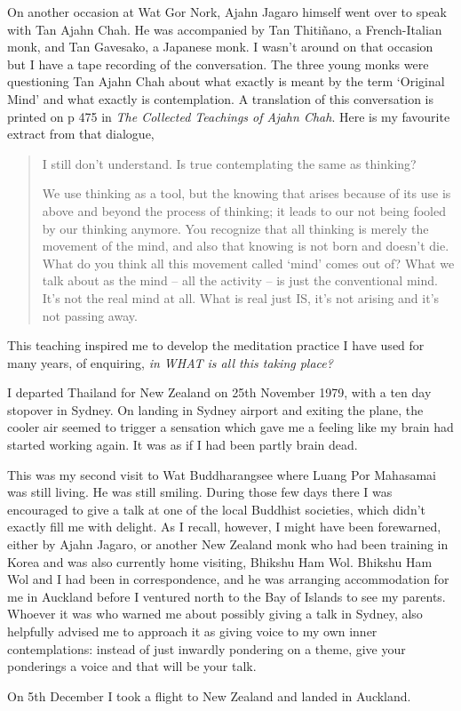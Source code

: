 On another occasion at Wat Gor Nork, Ajahn Jagaro himself went over to
speak with Tan Ajahn Chah. He was accompanied by Tan Thitiñano, a
French-Italian monk, and Tan Gavesako, a Japanese monk. I wasn't around
on that occasion but I have a tape recording of the conversation. The
three young monks were questioning Tan Ajahn Chah about what exactly is
meant by the term `Original Mind' and what exactly is contemplation. A
translation of this conversation is printed on p 475
in \emph{The Collected Teachings of Ajahn Chah}\cite{collected}.
Here is my favourite extract from that dialogue,

\begin{quotation}
 I still don't understand. Is true contemplating the same as thinking?

 We use thinking as a tool, but the knowing that arises
because of its use is above and beyond the process of thinking; it leads
to our not being fooled by our thinking anymore. You recognize that all
thinking is merely the movement of the mind, and also that knowing is
not born and doesn't die. What do you think all this movement called
`mind' comes out of? What we talk about as the mind -- all the activity
-- is just the conventional mind. It's not the real mind at all. What is
real just IS, it's not arising and it's not passing away.
\end{quotation}

This teaching inspired me to develop the meditation practice I have used
for many years, of enquiring, \emph{in WHAT is all this taking place?}

I departed Thailand for New Zealand on 25th November 1979, with a ten
day stopover in Sydney. On landing in Sydney airport and exiting the
plane, the cooler air seemed to trigger a sensation which gave me a
feeling like my brain had started working again. It was as if I had been
partly brain dead.

This was my second visit to Wat Buddharangsee where Luang Por
Mahasamai was still living. He was still smiling. During those few days
there I was encouraged to give a talk at one of the local Buddhist
societies, which didn't exactly fill me with delight. As I recall,
however, I might have been forewarned, either by Ajahn Jagaro, or
another New Zealand monk who had been training in Korea and was also
currently home visiting, Bhikshu Ham Wol. Bhikshu Ham Wol and I had been
in correspondence, and he was arranging accommodation for me in Auckland
before I ventured north to the Bay of Islands to see my parents. Whoever
it was who warned me about possibly giving a talk in Sydney, also
helpfully advised me to approach it as giving voice to my own inner
contemplations: instead of just inwardly pondering on a theme, give your
ponderings a voice and that will be your talk.

On 5th December I took a flight to New Zealand and landed in Auckland.

